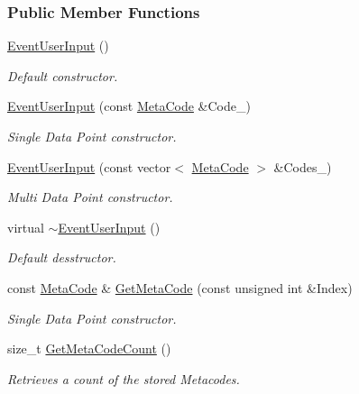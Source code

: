 \subsubsection*{Public Member Functions}
\begin{DoxyCompactItemize}
\item 
\hyperlink{classphys_1_1EventUserInput_ae7358d184021306da8979000c225845e}{EventUserInput} ()
\begin{DoxyCompactList}\small\item\em Default constructor. \item\end{DoxyCompactList}\item 
\hyperlink{classphys_1_1EventUserInput_af54d4604d18b25a2dc99a4a3090b9f1d}{EventUserInput} (const \hyperlink{classphys_1_1MetaCode}{MetaCode} \&Code\_\-)
\begin{DoxyCompactList}\small\item\em Single Data Point constructor. \item\end{DoxyCompactList}\item 
\hyperlink{classphys_1_1EventUserInput_a56ca671dd5d28396cab0d7036e08a1f1}{EventUserInput} (const vector$<$ \hyperlink{classphys_1_1MetaCode}{MetaCode} $>$ \&Codes\_\-)
\begin{DoxyCompactList}\small\item\em Multi Data Point constructor. \item\end{DoxyCompactList}\item 
virtual \hyperlink{classphys_1_1EventUserInput_a5c4bb6a5016dad4cb32f51cc1d88eac3}{$\sim$EventUserInput} ()
\begin{DoxyCompactList}\small\item\em Default desstructor. \item\end{DoxyCompactList}\item 
const \hyperlink{classphys_1_1MetaCode}{MetaCode} \& \hyperlink{classphys_1_1EventUserInput_a5f67c5ad4aa4edcce629955fd7d869ac}{GetMetaCode} (const unsigned int \&Index)
\begin{DoxyCompactList}\small\item\em Single Data Point constructor. \item\end{DoxyCompactList}\item 
size\_\-t \hyperlink{classphys_1_1EventUserInput_ae7964b1ac3a474415d6f6cf6c26a2f7b}{GetMetaCodeCount} ()
\begin{DoxyCompactList}\small\item\em Retrieves a count of the stored Metacodes. \item\end{DoxyCompactList}\item 

\end{DoxyCompactItemize}
